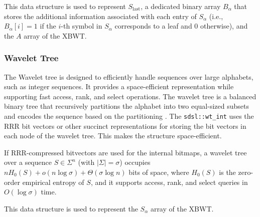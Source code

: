 This data structure is used to represent $S_{\text{last}}$, a dedicated binary array $B_{\alpha}$ that stores the additional information associated with each entry of $S_{\alpha}$ (i.e., $B_{\alpha}[i]=1$ if the $i$-th symbol in $S_{\alpha}$ corresponds to a leaf and $0$ otherwise), and the $A$ array of the XBWT.

\subsubsection{Wavelet Tree}
The Wavelet tree is designed to efficiently handle sequences over large alphabets, such as integer sequences. It provides a space-efficient representation while supporting fast access, rank, and select operations. The wavelet tree is a balanced binary tree that recursively partitions the alphabet into two equal-sized subsets and encodes the sequence based on the partitioning \cite{grossi2003high}. The \texttt{sdsl::wt\_int} uses the RRR bit vectors or other succinct representations for storing the bit vectors in each node of the wavelet tree. This makes the structure space-efficient.

If RRR-compressed bitvectors are used for the internal bitmaps, a wavelet tree over a sequence $S \in \Sigma^n$ (with $|\Sigma|=\sigma$) occupies $n H_0(S) + o(n \log \sigma) + \Theta(\sigma \log n)$ bits of space, where $H_0(S)$ is the zero-order empirical entropy of $S$, and it supports access, rank, and select queries in $O(\log \sigma)$ time.

This data structure is used to represent the $S_\alpha$ array of the XBWT.

